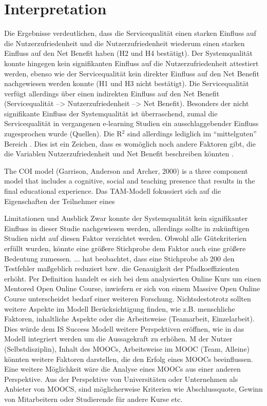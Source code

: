 \section{Interpretation}
\label{sec:vergleich}
Die Ergebnisse verdeutlichen, dass die Servicequalität einen starken Einfluss auf die Nutzerzufriedenheit und die Nutzerzufriedenheit wiederum einen starken Einfluss auf den Net Benefit haben (H2 und H4 bestätigt). Der Systemqualität konnte hingegen kein signifikanten Einfluss auf die Nutzerzufriedenheit attestiert werden, ebenso wie der Servicequalität kein direkter Einfluss auf den Net Benefit nachgewiesen werden konnte (H1 und H3 nicht bestätigt). Die Servicequalität verfügt allerdings über einen indirekten Einfluss auf den Net Benefit (Servicequalität --> Nutzerzufriedenheit --> Net Benefit). Besonders der nicht signifikante Einfluss der Systemqualität ist überraschend, zumal die Servicequalität in vergangenen e-learning Studien ein ausschlaggebender Einfluss zugesprochen wurde (Quellen).
Die R$^2$ sind allerdings lediglich im "`mittelguten"' Bereich \parencite[vgl.][S.323]{chin1998partial}. Dies ist ein Zeichen, dass es womöglich noch andere Faktoren gibt, die die Variablen Nutzerzufriedenheit und Net Benefit beschreiben könnten \parencite[vgl.][S.179]{freeze2010success}.  

The COI model (Garrison, Anderson and Archer, 2000) is a three component model that includes a cognitive, social and teaching presence that results in the final educational experience.
Das TAM-Modell fokussiert sich auf die Eigenschaften der Teilnehmer  eines 

Limitationen und Ausblick
Zwar konnte der Systemqualität kein signifikanter Einfluss in dieser Studie nachgewiesen werden, allerdings sollte in zukünftigen Studien nicht auf diesen Faktor verzichtet werden. Obwohl alle Gütekriterien erfüllt wurden, könnte eine größere Stichprobe dem Faktor auch eine größere Bedeutung zumessen. ... hat beobachtet, dass eine Stichprobe ab 200 den Testfehler maßgeblich reduziert bzw. die Genauigkeit der Pfadkoeffizienten erhöht.
Per Definition handelt es sich bei dem analysierten Online Kurs um einen Mentored Open Online Course, inwiefern er sich von einem Massive Open Online Course unterscheidet bedarf einer weiteren Forschung. 
Nichtsdestotrotz sollten weitere Aspekte im Modell Berücksichtigung finden, wie z.B. menschliche Faktoren, inhaltliche Aspekte oder die Arbeitsweise (Teamarbeit, Einzelarbeit). Dies würde dem IS Success Modell weitere Perspektiven eröffnen, wie  in das Modell integriert werden um die Aussagekraft zu erhöhen. M der Nutzer (Selbstdisziplin), Inhalt des MOOCs, Arbeitsweise im MOOC (Team, Alleine) könnten weitere Faktoren darstellen, die den Erfolg eines MOOCs beeinflussen. 
Eine weitere Möglichkeit wäre die Analyse eines MOOCs aus einer anderen Perspektive. Aus der Perspektive von Universitäten oder Unternehmen als Anbieter von MOOCS, sind möglicherweise Kriterien wie Abschlussquote, Gewinn von Mitarbeitern oder Studierende für andere Kurse etc. 


